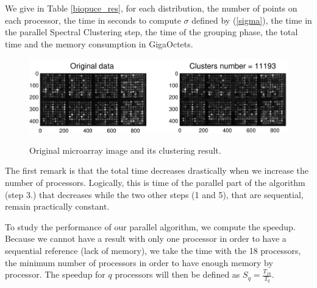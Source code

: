 \documentclass[]{svmult}
\begin{document}
We give in Table \ref{biopuce_res}, for each distribution, the number
of points on each processor, the time in seconds to compute $\sigma$ defined by
(\ref{sigma}), the time in the parallel Spectral Clustering step, the time of
the grouping phase, the total time and the memory consumption in GigaOctets.
\begin{figure}
   \begin{center}
 {\includegraphics[width=\linewidth]{biopuce250b}}
   \end{center}
   \caption{Original microarray image and its clustering result.}  
   \label{biopuceresult}
 \end{figure}

The first remark is that the total time decreases drastically when we increase
the number of processors. Logically, this is time of the parallel part of the
algorithm (step 3.) that decreases while the two other steps (1 and 5),
that are sequential, remain practically constant.

To study the performance of our parallel algorithm, we compute the speedup.
Because we cannot have a result with only
one processor in order to have a sequential reference (lack of memory), we
take the time with the 18 processors, the minimum number of processors in
order to have enough memory by processor. The speedup for $q$
processors will then be defined as $S_q = \frac{T_{18}}{ T_q}.$
\end{document}
